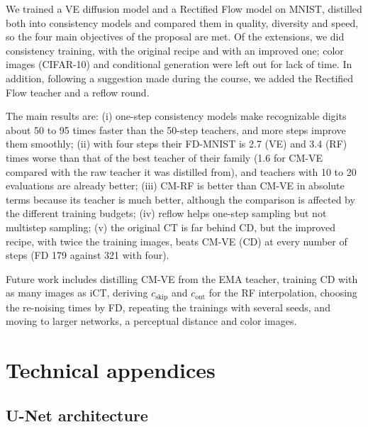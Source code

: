 \documentclass{article}
\begin{document}
We trained a VE diffusion model and a Rectified Flow model on MNIST, distilled
both into consistency models and compared them in quality, diversity and speed,
so the four main objectives of the proposal are met. Of the extensions, we did
consistency training, with the original recipe and with an improved one; color
images (CIFAR-10) and conditional generation were left out for lack of time. In
addition, following a suggestion made during the course, we added the Rectified
Flow teacher and a reflow round.

The main results are: (i) one-step consistency models make recognizable digits
about 50 to 95 times faster than the 50-step teachers, and more steps improve
them smoothly; (ii) with four steps their FD-MNIST is 2.7 (VE) and 3.4 (RF) times
worse than that of the best teacher of their family (1.6 for CM-VE compared with
the raw teacher it was distilled from), and teachers with 10 to 20 evaluations
are already better; (iii) CM-RF is better than CM-VE in absolute terms because
its teacher is much better, although the comparison is affected by the different
training budgets; (iv) reflow helps one-step sampling but not multistep
sampling; (v) the original CT is far behind CD, but the improved recipe, with
twice the training images, beats CM-VE (CD) at every number of steps (FD 179
against 321 with four).

Future work includes distilling CM-VE from the EMA teacher, training CD with as
many images as iCT, deriving $c_\text{skip}$ and $c_\text{out}$ for the RF
interpolation, choosing the re-noising times by FD, repeating the trainings with
several seeds, and moving to larger networks, a perceptual distance and color
images.

{\small


}

\appendix
\section{Technical appendices}
\label{sec:appendix}

\subsection{U-Net architecture}
\label{sec:app_unet}
\end{document}
